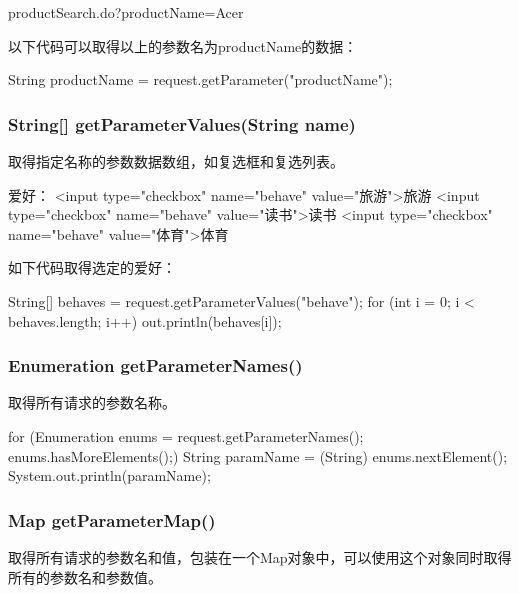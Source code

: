 
\begin{xmlCode}
  productSearch.do?productName=Acer    
\end{xmlCode}

以下代码可以取得以上的参数名为productName的数据：

\begin{javaCode}
  String productName = request.getParameter("productName");
\end{javaCode}


\subsubsection{String[] getParameterValues(String name)}

取得指定名称的参数数据数组，如复选框和复选列表。


\begin{xmlCode}
  爱好：
  <input type="checkbox" name="behave" value="旅游">旅游
  <input type="checkbox" name="behave" value="读书">读书
  <input type="checkbox" name="behave" value="体育">体育
\end{xmlCode}

如下代码取得选定的爱好：

\begin{javaCode}
  String[] behaves = request.getParameterValues("behave");
  for (int i = 0; i < behaves.length; i++) {
    out.println(behaves[i]);
  }
\end{javaCode}

\subsubsection{Enumeration getParameterNames()}

取得所有请求的参数名称。

\begin{javaCode}
  for (Enumeration enums = request.getParameterNames(); enums.hasMoreElements();) {
    String paramName = (String) enums.nextElement();
    System.out.println(paramName);
  }
\end{javaCode}

\subsubsection{Map getParameterMap()}

取得所有请求的参数名和值，包装在一个Map对象中，可以使用这个对象同时取得
所有的参数名和参数值。

